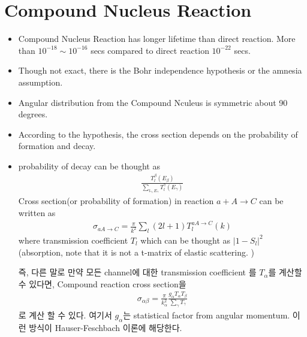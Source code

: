 \documentclass[11pt]{book}
\newcommand{\bea}{\begin{eqnarray}}
\newcommand{\eea}{\end{eqnarray}}
\begin{document}
\section{Compound Nucleus Reaction} 
\begin{itemize}
	\item Compound Nucleus Reaction has longer lifetime than direct reaction. 
	      More than $10^{-18}\sim 10^{-16}$ secs compared to direct reaction $10^{-22}$ secs. 
	\item Though not exact, there is the Bohr independence hypothesis or the amnesia assumption.  
	\item Angular distribution from the Compound Nculeus is symmetric about 90 degrees. 
	\item According to the hypothesis, the cross section depends on the probability of 
	      formation and decay. 
	      
	\item probability of decay can be thought as
	      \bea 
	      \frac{T_{l}^\beta(E_\beta)}{\sum_{l_\gamma, E_\gamma} T_l^\gamma(E_\gamma)}
	      \eea  
	      Cross section(or probability of formation) in reaction $a+A\to C$ can be written as
	      \bea 
	      \sigma_{aA\to C} =\frac{\pi}{k^2}\sum_{l}(2l+1) T_l^{aA\to C}(k)
	      \eea 
	      where transmission coefficient $T_l$ which can be thought as $|1-S_l|^2$(absorption, 
	      note that it is not a t-matrix of elastic scattering. )
	      
	      즉, 다른 말로 만약 모든 channel에 대한 transmission coefficient 를 $T_\alpha$를 
	      계산할 수 있다면, 
	      Compound reaction cross section을 
	      \bea 
	      \sigma_{\alpha\beta}=\frac{\pi}{k_\alpha^2}\frac{g_\alpha T_\alpha T_\beta}{\sum_\gamma T_\gamma}
	      \eea  
	      로 계산 할 수 있다. 여기서 $g_\alpha$는 statistical factor from angular momentum. 
	      이런 방식이 Hauser-Feschbach 이론에 해당한다. 
	      

\end{itemize}
\end{document}
